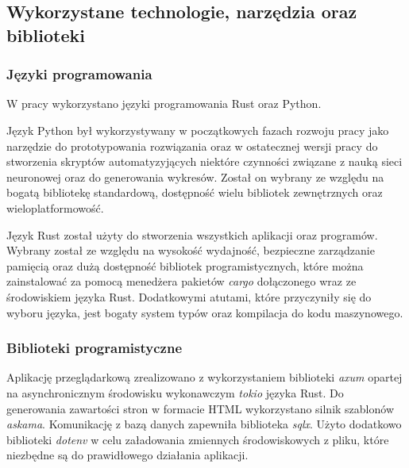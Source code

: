     \subsection{Wykorzystane technologie, narzędzia oraz biblioteki}

        \subsubsection{Języki programowania}

            W pracy wykorzystano języki programowania Rust\cite{Rust} oraz Python\cite{Python}.
            
            Język Python był wykorzystywany w początkowych fazach rozwoju pracy jako narzędzie do prototypowania rozwiązania oraz w ostatecznej wersji pracy do stworzenia skryptów automatyzyjących niektóre czynności związane z nauką sieci neuronowej oraz do generowania wykresów. Został on wybrany ze względu na bogatą bibliotekę standardową, dostępność wielu bibliotek zewnętrznych oraz wieloplatformowość.
            
            Język Rust został użyty do stworzenia wszystkich aplikacji oraz programów. Wybrany został ze względu na wysokość wydajność, bezpieczne zarządzanie pamięcią oraz dużą dostępność bibliotek programistycznych, które można zainstalować za pomocą menedżera pakietów \textit{cargo}\cite{Rust:cargo} dołączonego wraz ze środowiskiem języka Rust. Dodatkowymi atutami, które przyczyniły się do wyboru języka, jest bogaty system typów oraz kompilacja do kodu maszynowego. 

        \subsubsection{Biblioteki programistyczne}

            Aplikację przeglądarkową zrealizowano z wykorzystaniem biblioteki \textit{axum}\cite{Rust:axum} opartej na asynchronicznym środowisku wykonawczym \textit{tokio}\cite{Rust:tokio} języka Rust.
            Do generowania zawartości stron w formacie HTML wykorzystano silnik szablonów \textit{askama}\cite{Rust:askama}. Komunikację z bazą danych zapewniła biblioteka \textit{sqlx}\cite{Rust:sqlx}. Użyto dodatkowo biblioteki \textit{dotenv}\cite{Rust:dotenv} w celu załadowania zmiennych środowiskowych z pliku, które niezbędne są do prawidłowego działania aplikacji.

